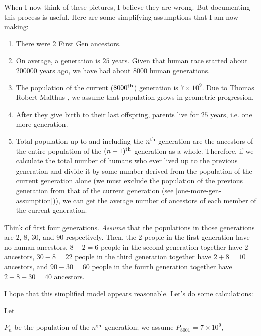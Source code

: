 \documentclass[12pt,a4paper]{book}
\begin{document}
{\begin{enumerate}
            When I now think of these pictures, I believe they are wrong. But documenting this process is useful. Here are some simplifying assumptions that I am now making:
            \begin{enumerate}
                \item There were 2 First Gen ancestors.
                \item On average, a generation is $25$ years. Given that human race started about $200000$ years ago, we have had about $8000$ human generations.
                \item The population of the current ($8000\textsuperscript{th}$) generation is $7\times10^9$. Due to Thomas Robert Malthus \cite{malthus}, we assume that population grows in geometric progression.
                \item \label{one-more-gen-assumption} After they give birth to their last offspring, parents live for $25$ years, i.e. one more generation.
                \item Total population up to and including the $n\textsuperscript{th}$ generation are the ancestors of the entire population of the $(n+1)\textsuperscript{th}$ generation as a whole. Therefore, if we calculate the total number of humans who ever lived up to the previous generation and divide it by some number derived from the population of the current generation alone (we must exclude the population of the previous generation from that of the current generation (see \ref{one-more-gen-assumption})), we can get the average number of ancestors of each member of the current generation.
            \end{enumerate}

            Think of first four generations. \emph{Assume} that the populations in those generations are $2$, $8$, $30$, and $90$ respectively. Then, the $2$ people in the first generation have no human ancestors, $8-2=6$ people in the second generation together have $2$ ancestors, $30-8=22$ people in the third generation together have $2+8=10$ ancestors, and $90-30=60$ people in the fourth generation together have $2+8+30=40$ ancestors.

            I hope that this simplified model appears reasonable. Let's do some calculations:
            
            Let 

            $P_n$ be the population of the $n\textsuperscript{th}$ generation; we assume $P_{8001} = 7\times 10^9$, 
            

\end{enumerate}}
\end{document}
